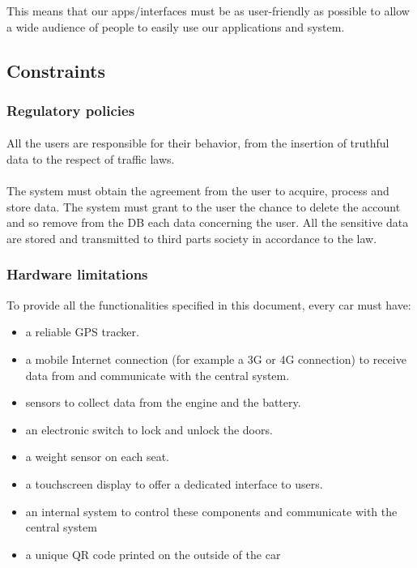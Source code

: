 \documentclass[english]{article}
\begin{document}
This means that our apps/interfaces must be as user-friendly as possible to allow a wide audience of people to easily use our applications and system. 

\newpage
\subsection{Constraints}\label{constraints}

\subsubsection{Regulatory policies}

\paragraph{}
All the users are responsible for their behavior, from the insertion of truthful data to the respect of traffic laws.

\paragraph{}
The system must obtain the agreement from the user to acquire, process and store data.\newline
The system must grant to the user the chance to delete the account and so remove from the DB each data concerning the user.\newline
All the sensitive data are stored and transmitted to third parts society in accordance to the law.\newline

\subsubsection{Hardware limitations}

To provide all the functionalities specified in this document, every car must have:
\begin{itemize}
	\item{a reliable GPS tracker.}
	\item{a mobile Internet connection (for example a 3G or 4G connection) to receive data from and communicate with the central system.}
	\item{sensors to collect data from the engine and the battery.}
	\item{an electronic switch to lock and unlock the doors.}
	\item{a weight sensor on each seat.}
	\item{a touchscreen display to offer a dedicated interface to users.}
	\item{an internal system to control these components and communicate with the central system}
	\item{a unique QR code printed on the outside of the car}
\end{itemize}
\end{document}
